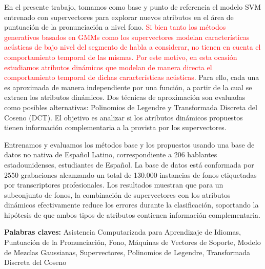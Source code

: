 En el presente trabajo, tomamos como
base y punto de referencia el modelo SVM entrenado con
supervectores para explorar nuevos atributos en el área de puntuación de la
pronunciación a nivel fono.
\textcolor{red}{
Si bien tanto los métodos generativos basados en GMMs como
los supervectores modelan características acústicas de bajo nivel del segmento
de habla a considerar,
no tienen en cuenta el comportamiento temporal de las mismas.
Por este motivo, en esta ocasión
estudiamos atributos dinámicos
que modelan de manera directa el comportamiento temporal de dichas
características acústicas}.
Para ello, cada una es aproximada
de manera independiente por una función,
a partir de la cual se extraen los atributos dinámicos.
Dos técnicas de aproximación son evaluadas como posibles alternativas:
Polinomios de Legendre y Transformada Discreta del Coseno (DCT).
El objetivo
es analizar si
los atributos dinámicos propuestos tienen información
complementaria a la provista por los supervectores.

Entrenamos y evaluamos los métodos base y los propuestos usando una base de datos no nativa
de Español Latino, correspondiente a 206 hablantes estadounidenses, estudiantes de Español.
La base de datos está conformada por 2550 grabaciones alcanzando
un total de 130.000 instancias de fonos etiquetadas
por transcriptores profesionales.
Los resultados muestran que para un subconjunto de fonos, la combinación de supervectores
con los atributos dinámicos efectivamente reduce los errores durante la clasificación,
soportando la
hipótesis de que ambos tipos de atributos contienen información complementaria.

\bigskip

\noindent\textbf{Palabras claves:} Asistencia Computarizada para Aprendizaje de Idiomas, Puntuación de la Pronunciación, Fono, Máquinas de Vectores de Soporte, Modelo de Mezclas Gaussianas, Supervectores, Polinomios de Legendre, Transformada Discreta del Coseno

